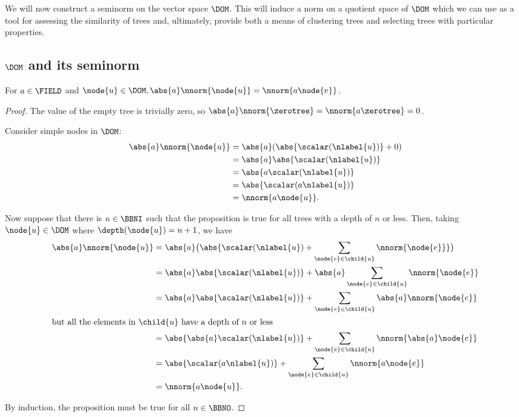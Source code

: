 We will now construct a seminorm on the vector space
$\DOM$. This will induce a norm on a quotient space of $\DOM$ which we
can use as a tool for assessing the similarity of trees and,
ultimately, provide both a means of clustering trees and selecting
trees with particular properties.

\subsection{$\DOM$ and its seminorm}

\begin{proposition}\label{absolutehomogeneity}
  For $a \in \FIELD$ and $\node{u} \in \DOM, \abs{a}\nnorm{\node{u}} =
  \nnorm{a \node{v}}$.
  \begin{proof}
    The value of the empty tree is trivially zero, so $\abs{a}\nnorm{\zerotree} =
    \nnorm{a\zerotree} = 0$.

    Consider simple nodes in $\DOM$:
    \begin{align*}
      \abs{a}\nnorm{\node{u}} &= \abs{a}(\abs{\scalar(\nlabel{u})} + 0) \\
      &= \abs{a}\abs{\scalar(\nlabel{u})} \\
      &= \abs{a\scalar(\nlabel{u})} \\
      &= \abs{\scalar(a\nlabel{u})} \\
      &= \nnorm{a \node{u}}.
    \end{align*}

    Now suppose that there is $n \in \BBNI$ such that the proposition is true for
    all trees with a depth of $n$ or less. Then, taking $\node{u} \in
    \DOM$ where $\depth(\node{u}) = n+1$, we have
    \begin{align*}
      \abs{a}\nnorm{\node{u}} &= \abs{a}\bigl(\abs{\scalar(\nlabel{u}) + \sum_{\node{e}\in\child{u}}\nnorm{\node{e}}}\bigr) \\
      &= \abs{a}\abs{\scalar(\nlabel{u})} + \abs{a}\sum_{\node{e}\in\child{u}}\nnorm{\node{e}}\\
      &= \abs{a}\abs{\scalar(\nlabel{u})} + \sum_{\node{e}\in\child{u}}\abs{a}\nnorm{\node{e}}\\
      \intertext{but all the elements in $\child{u}$ have a depth of $n$ or less}
      &= \abs{\abs{a}\scalar(\nlabel{u})} + \sum_{\node{e}\in\child{u}}\nnorm{\abs{a}\node{e}} \\
      &= \abs{\scalar(a\nlabel{u})} + \sum_{\node{e}\in\child{u}}\nnorm{a \node{e}} \\
      &= \nnorm{a \node{u}}.
    \end{align*}

    By induction, the proposition must be true for all $n \in \BBNO$.
  \end{proof}
\end{proposition}

